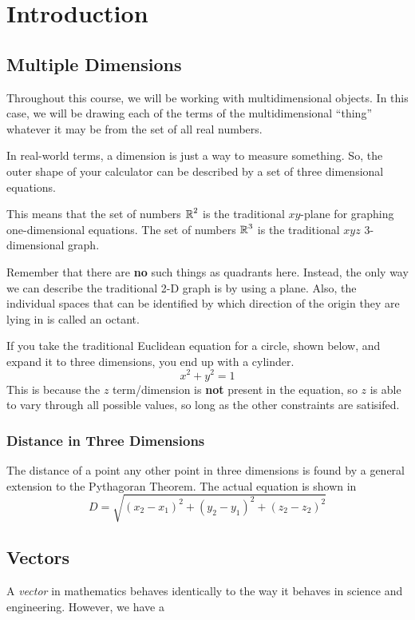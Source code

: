 \section{Introduction}\label{sec:Intro}
\subsection{Multiple Dimensions}\label{subsec:Multiple_Dimensions}
Throughout this course, we will be working with multidimensional objects.
In this case, we will be drawing each of the terms of the multidimensional ``thing'' whatever it may be from the set of all real numbers.

In real-world terms, a dimension is just a way to measure something.
So, the outer shape of your calculator can be described by a set of three dimensional equations.

This means that the set of numbers $\operatorname{\mathbb{R}}^{2}$ is the traditional $xy$-plane for graphing one-dimensional equations.
The set of numbers $\operatorname{\mathbb{R}}^{3}$ is the traditional $xyz$ 3-dimensional graph.

\begin{remark*}
  Remember that there are \textbf{no} such things as quadrants here.
  Instead, the only way we can describe the traditional 2-D graph is by using a plane.
  Also, the individual spaces that can be identified by which direction of the origin they are lying in is called an octant.
\end{remark*}

If you take the traditional Euclidean equation for a circle, shown below, and expand it to three dimensions, you end up with a cylinder.
\begin{equation*}
  x^{2} + y^{2} = 1
\end{equation*}
This is because the $z$ term/dimension is \textbf{not} present in the equation, so $z$ is able to vary through all possible values, so long as the other constraints are satisifed.

\subsubsection{Distance in Three Dimensions}\label{subsubsec:3D_Distance}
The distance of a point any other point in three dimensions is found by a general extension to the Pythagoran Theorem.
The actual equation is shown in 
\begin{equation}\label{eq:3D_Distance}
  D = \sqrt{{(x_{2}-x_{1})}^{2} + {(y_{2}-y_{1})}^{2} + {(z_{2}-z_{2})}^{2}}
\end{equation}

\subsection{Vectors}
\begin{definition}[Vector]\label{def:Vector}
  A \emph{vector} in mathematics behaves identically to the way it behaves in science and engineering.
  However, we have a
\end{definition}



